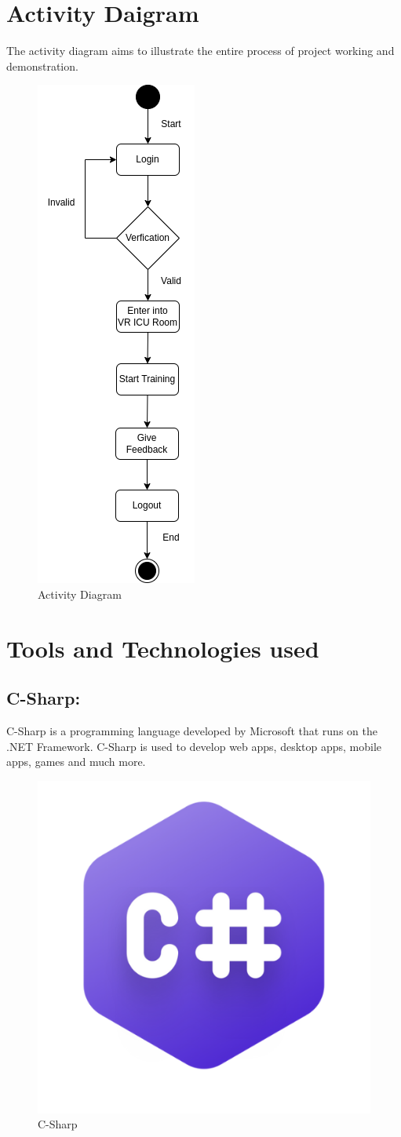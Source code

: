 \section{Activity Daigram}
The activity diagram aims to illustrate the entire process of project working and demonstration.
\begin{figure}[h]
    \centering
    \includegraphics[width=0.25\linewidth]{Images/Activity.drawio.png}
    \caption{Activity Diagram}
\end{figure}

\section{Tools and Technologies used}
\subsection{C-Sharp:}
C-Sharp is a programming language developed by Microsoft that runs on the .NET Framework. C-Sharp is used to develop web apps, desktop apps, mobile apps, games and much more.
\begin{figure}[h]
	\centering
	\includegraphics[width=0.2\linewidth, height=0.2\linewidth]{Images/CSharp.png}
	\caption{C-Sharp\cite{csharp}}
\end{figure}
